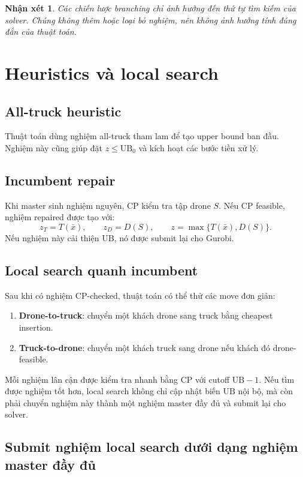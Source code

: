 \documentclass[12pt,a4paper]{article}
\newtheorem{remark}{Nhận xét}
\newcommand{\UB}{\mathrm{UB}}
\begin{document}
\begin{remark}
Các chiến lược branching chỉ ảnh hưởng đến thứ tự tìm kiếm của solver. Chúng không thêm hoặc loại bỏ nghiệm, nên không ảnh hưởng tính đúng đắn của thuật toán.
\end{remark}

\section{Heuristics và local search}
\label{sec:heuristics}

\subsection{All-truck heuristic}
Thuật toán dùng nghiệm all-truck tham lam để tạo upper bound ban đầu. Nghiệm này cũng giúp đặt $z\le \UB_0$ và kích hoạt các bước tiền xử lý.

\subsection{Incumbent repair}
Khi master sinh nghiệm nguyên, CP kiểm tra tập drone $S$. Nếu CP feasible, nghiệm repaired được tạo với:
\[
    z_T=T(\bar x),\qquad z_D=D(S),\qquad z=\max\{T(\bar x),D(S)\}.
\]
Nếu nghiệm này cải thiện $\UB$, nó được submit lại cho Gurobi.

\subsection{Local search quanh incumbent}
Sau khi có nghiệm CP-checked, thuật toán có thể thử các move đơn giản:
\begin{enumerate}[leftmargin=2em]
    \item \textbf{Drone-to-truck}: chuyển một khách drone sang truck bằng cheapest insertion.
    \item \textbf{Truck-to-drone}: chuyển một khách truck sang drone nếu khách đó drone-feasible.
\end{enumerate}
Mỗi nghiệm lân cận được kiểm tra nhanh bằng CP với cutoff $\UB-1$. Nếu tìm được nghiệm tốt hơn, local search không chỉ cập nhật biến $\UB$ nội bộ, mà còn phải chuyển nghiệm này thành một nghiệm master đầy đủ và submit lại cho solver.

\subsection{Submit nghiệm local search dưới dạng nghiệm master đầy đủ}
\label{subsec:local-search-master-hint}
\end{document}
